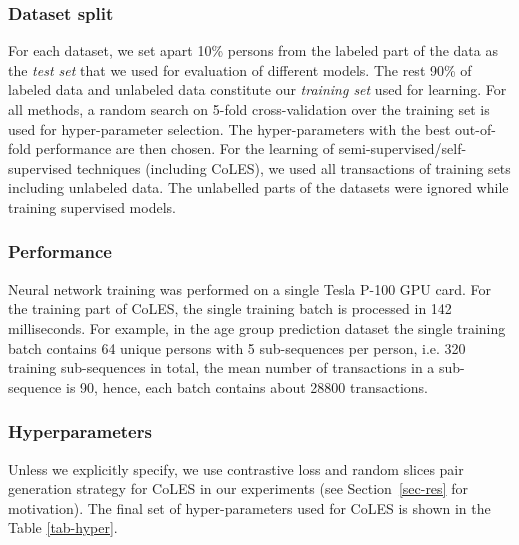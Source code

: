 \documentclass[sigconf, anonymous]{acmart}
\begin{document}
\subsubsection{Dataset split}

For each dataset, we set apart 10\% persons from the labeled part of the data as the \textit{test set} that we used for evaluation of different models. The rest 90\% of labeled data and unlabeled data constitute our \textit{training set} used for learning. For all methods, a random search on 5-fold cross-validation over the training set is used for hyper-parameter selection. The hyper-parameters with the best out-of-fold performance are then chosen.
For the learning of semi-supervised/self-supervised techniques (including CoLES), we used all transactions of training sets including unlabeled data. The unlabelled parts of the datasets were ignored while training supervised models.

\subsubsection{Performance}

Neural network training was performed on a single Tesla P-100 GPU card. For the training part of CoLES, the single training batch is processed in 142 milliseconds. For example, in the age group prediction dataset the single training batch contains 64 unique persons with 5 sub-sequences per person, i.e. 320 training sub-sequences in total, the mean number of transactions in a sub-sequence is 90, hence, each batch contains about 28800 transactions.

\subsubsection{Hyperparameters}

Unless we explicitly specify, we use contrastive loss and random slices pair generation strategy for CoLES in our experiments (see Section~\ref{sec-res} for motivation). The final set of hyper-parameters used for CoLES is shown in the Table \ref{tab-hyper}.

\end{document}
